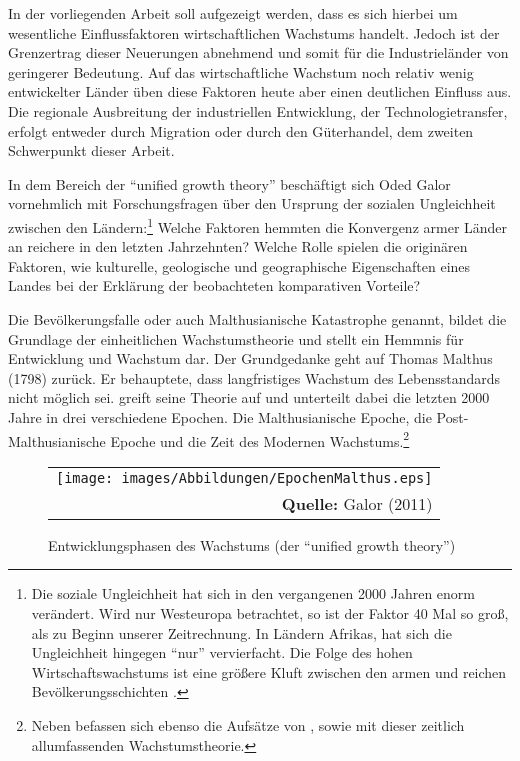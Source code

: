 In der vorliegenden Arbeit soll aufgezeigt werden, dass es sich hierbei um wesentliche Einflussfaktoren wirtschaftlichen Wachstums handelt. Jedoch ist der Grenzertrag dieser Neuerungen abnehmend und somit f{\"u}r die Industriel{\"a}nder von geringerer Bedeutung. Auf das wirtschaftliche Wachstum noch relativ wenig entwickelter Länder üben diese Faktoren heute aber einen deutlichen Einfluss aus. Die regionale Ausbreitung der industriellen Entwicklung, der Technologietransfer, erfolgt entweder durch Migration oder durch den G{\"u}terhandel, dem zweiten Schwerpunkt dieser Arbeit.\newline 


In dem Bereich der "`unified growth theory"' besch{\"a}ftigt sich Oded Galor vornehmlich mit  Forschungsfragen {\"u}ber den Ursprung der sozialen Ungleichheit zwischen den L{\"a}ndern:\footnote{Die soziale Ungleichheit hat sich in den vergangenen 2000 Jahren enorm verändert. Wird nur Westeuropa betrachtet, so ist der Faktor 40 Mal so gro{\ss}, als zu Beginn unserer Zeitrechnung. In Ländern Afrikas, hat sich die Ungleichheit hingegen "`nur"' vervierfacht. Die Folge des hohen Wirtschaftswachstums ist eine gr{\"o}{\ss}ere Kluft zwischen den armen und reichen Bev{\"o}lkerungsschichten \citep{Galor.2011}.} Welche Faktoren hemmten die Konvergenz armer L{\"a}nder an reichere in den letzten Jahrzehnten? Welche Rolle spielen die originären Faktoren, wie kulturelle, geologische und geographische  Eigenschaften eines Landes bei der Erkl{\"a}rung der beobachteten komparativen Vorteile?\newline


Die Bev{\"o}lkerungsfalle oder auch Malthusianische Katastrophe genannt, bildet die Grundlage der einheitlichen Wachstumstheorie und stellt ein Hemmnis f{\"u}r Entwicklung und Wachstum dar. Der Grundgedanke geht auf Thomas Malthus (1798) zur{\"u}ck. Er behauptete, dass langfristiges Wachstum des Lebensstandards nicht m{\"o}glich sei. \citet{Galor.2011} greift seine Theorie auf und unterteilt dabei die letzten 2000 Jahre in drei verschiedene Epochen. Die Malthusianische Epoche, die Post-Malthusianische Epoche und die Zeit des Modernen Wachstums.\footnote{Neben \citet{Galor.2006} befassen sich ebenso die Aufsätze von \citet{Hansen.2002}, sowie \citet{Ashraf.2008} mit dieser zeitlich allumfassenden Wachstumstheorie.}\\

		\begin{figure}[htbp]
			\centering 
			\begin{tabular}{@{}r@{}}  
				\texttt{[image: images/Abbildungen/EpochenMalthus.eps]}\\
				\footnotesize\sffamily\textbf{Quelle:} Galor (2011) %
			\end{tabular}  
			\caption{Entwicklungsphasen des Wachstums (der "`unified growth theory"')} 
			\label{Epochen}
		\end{figure}
		
